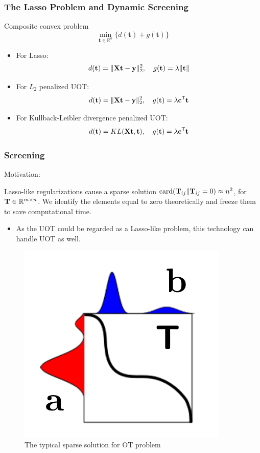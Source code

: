 \documentclass[dvipdfmx,cjk,t,10pt]{beamer}
\newcommand{\tranT}{\mathsf T}
\renewcommand{\vec}[1]{\mathbf{#1}}
\begin{document}
\begin{frame}
\frametitle{The Lasso Problem and Dynamic Screening}
		\begin{screen}{Composite convex problem}
\begin{equation}
\min _{\vec{t} \in \mathbb{R}^{n}}\{d(\vec{t})+g(\vec{t})\}
\end{equation}
	\end{screen}	
\begin{itemize}
	\item For Lasso:
	$$
		d(\vec{t})= \|\mat{X}\vec{t}-\vec{y}\|_2^2, \quad g(\vec{t}) = \lambda \|\vec{t}\|
	$$
	
	\item For $L_2$ penalized UOT:
	$$
		d(\vec{t})= \|\mat{X}\vec{t}-\vec{y}\|_2^2, \quad g(\vec{t}) = \lambda \vec{c}^{\tranT}\vec{t}
	$$

	\item For Kullback-Leibler divergence penalized UOT:
	$$
		d(\vec{t})= KL(\mat{X}\vec{t},\vec{t}),\quad g(\vec{t}) =  \lambda \vec{c}^{\tranT}\vec{t}
	$$
\end{itemize}

\end{frame}


\begin{frame}
\frametitle{Screening}
	\begin{screen}{Motivation:}
	
	\quad Lasso-like regularizations cause a sparse solution $\operatorname{card}(\mbox{\bf T}_{ij}\|\mbox{\bf T}_{ij} = 0)\approx n^2$, for $\mbox{\bf T} \in \mathbb{R}^{m \times n}$. We identify the elements equal to zero theoretically and freeze them to save computational time.
	
	\end{screen}	
		\begin{itemize}
		\item As the UOT could be regarded as a Lasso-like problem, this technology can handle UOT as well.
	   	\end{itemize}
	\begin{figure}[htbp]
	\begin{center}	
	\includegraphics[width=0.3\hsize]{pic/sparse}
	\caption{The typical sparse solution for OT problem}
	\end{center}	
	\end{figure}	
	
\end{frame}
\end{document}

